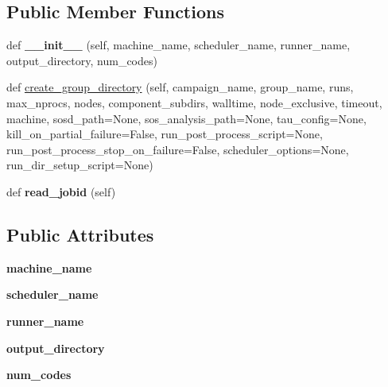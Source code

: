 \subsection*{Public Member Functions}
\begin{DoxyCompactItemize}
\item 
\mbox{\label{classcodar_1_1cheetah_1_1launchers_1_1_launcher_a646b70e47e85def77f4ba1dbfbeb5b34}} 
def {\bfseries \+\_\+\+\_\+init\+\_\+\+\_\+} (self, machine\+\_\+name, scheduler\+\_\+name, runner\+\_\+name, output\+\_\+directory, num\+\_\+codes)
\item 
def \hyperlink{classcodar_1_1cheetah_1_1launchers_1_1_launcher_a96798b79cb86f858f30dfdff1618bfb3}{create\+\_\+group\+\_\+directory} (self, campaign\+\_\+name, group\+\_\+name, runs, max\+\_\+nprocs, nodes, component\+\_\+subdirs, walltime, node\+\_\+exclusive, timeout, machine, sosd\+\_\+path=None, sos\+\_\+analysis\+\_\+path=None, tau\+\_\+config=None, kill\+\_\+on\+\_\+partial\+\_\+failure=False, run\+\_\+post\+\_\+process\+\_\+script=None, run\+\_\+post\+\_\+process\+\_\+stop\+\_\+on\+\_\+failure=False, scheduler\+\_\+options=None, run\+\_\+dir\+\_\+setup\+\_\+script=None)
\item 
\mbox{\label{classcodar_1_1cheetah_1_1launchers_1_1_launcher_af6f838444c55859d67a1ad60fed1198e}} 
def {\bfseries read\+\_\+jobid} (self)
\end{DoxyCompactItemize}
\subsection*{Public Attributes}
\begin{DoxyCompactItemize}
\item 
\mbox{\label{classcodar_1_1cheetah_1_1launchers_1_1_launcher_a86b1aeb4e2269748abe1a8bed98202f6}} 
{\bfseries machine\+\_\+name}
\item 
\mbox{\label{classcodar_1_1cheetah_1_1launchers_1_1_launcher_aded443c0ede567093c5104eb325b87bc}} 
{\bfseries scheduler\+\_\+name}
\item 
\mbox{\label{classcodar_1_1cheetah_1_1launchers_1_1_launcher_a70843b9eef7ddfd447dd31344a8ac416}} 
{\bfseries runner\+\_\+name}
\item 
\mbox{\label{classcodar_1_1cheetah_1_1launchers_1_1_launcher_a670353f0a0273fde7c77e298850210dc}} 
{\bfseries output\+\_\+directory}
\item 
\mbox{\label{classcodar_1_1cheetah_1_1launchers_1_1_launcher_a1e3bb2f0be7b5093daf6a6391d386a09}} 
{\bfseries num\+\_\+codes}
\end{DoxyCompactItemize}
